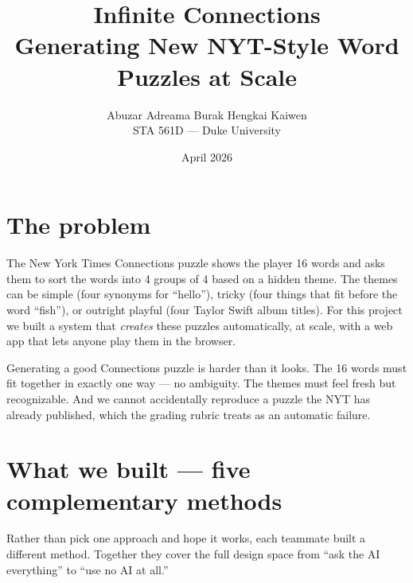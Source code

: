 \documentclass[11pt, letterpaper]{article}
\title{\textbf{Infinite Connections}\\[0.2em]
\large Generating New NYT-Style Word Puzzles at Scale}
\author{Abuzar \quad Adreama \quad Burak \quad Hengkai \quad Kaiwen \\[0.3em]
STA 561D --- Duke University}
\date{April 2026}
\begin{document}
\maketitle
\thispagestyle{fancy}
\vspace{-2em}

\section*{The problem}

The New York Times Connections puzzle shows the player 16 words and asks them
to sort the words into 4 groups of 4 based on a hidden theme. The themes can
be simple (four synonyms for ``hello''), tricky (four things that fit before the
word ``fish''), or outright playful (four Taylor Swift album titles). For this
project we built a system that \emph{creates} these puzzles automatically, at
scale, with a web app that lets anyone play them in the browser.

Generating a good Connections puzzle is harder than it looks. The 16 words must
fit together in exactly one way --- no ambiguity. The themes must feel fresh
but recognizable. And we cannot accidentally reproduce a puzzle the NYT has
already published, which the grading rubric treats as an automatic failure.

\section*{What we built --- five complementary methods}

Rather than pick one approach and hope it works, each teammate built a different
method. Together they cover the full design space from ``ask the AI everything''
to ``use no AI at all.''
\end{document}
